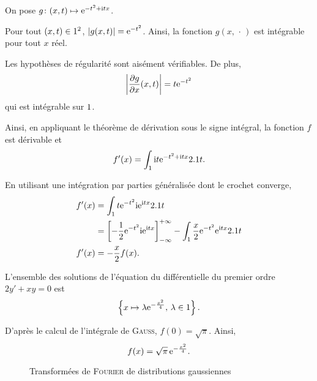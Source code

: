\begin{solution} On pose $\fonctionligne[g]{(x, t)}{\e^{-t^2 + \i t x}}$.
\begin{reponses}
\item Pour tout $(x, t) \in \R^2$,  $\module{g(x, t)} = \e^{-t^2}$. Ainsi, la fonction $g(x, \,\cdot\,)$ est intégrable pour tout $x$ réel.

\item Les hypothèses de régularité sont aisément vérifiables. De plus,
\[
\module{\frac{\partial g}{\partial x}(x, t)} = t \e^{-t^2}
\]
qui est intégrable sur $\R$.

Ainsi, en appliquant le théorème de dérivation sous le signe intégral, la fonction $f$ est dérivable et
\[
f'(x) = \int_\R \i t \e^{-t^2 + \i t x} \d t.
\]

\item En utilisant une intégration par parties généralisée dont le crochet converge,
\begin{align*}
f'(x) &= \int_\R t \e^{-t^2} \i \e^{\i t x} \d t \\
&= \left[-\frac{1}{2} \e^{-t^2} \i \e^{\i t x}\right]_{-\infty}^{+\infty} - \int_\R \frac{x}{2} \e^{-t^2} \e^{\i t x} \d t \\
f'(x) &= -\frac{x}{2} f(x).
\end{align*}

\item L'ensemble des solutions de l'équation du différentielle du premier ordre $2 y' + x y = 0$ est
\[
\left\{x \mapsto \lambda \e^{-\frac{x^2}{4}},\, \lambda \in \R\right\}.
\]

D'après le calcul de l'intégrale de \textsc{Gauss}, $f(0) = \sqrt{\pi}$. Ainsi,
\[
f(x) = \sqrt{\pi}\, \e^{-\frac{x^2}{4}}.
\]
\end{reponses}
\end{solution}

\begin{figure}
    \centering
    
    \caption{Transformées de \textsc{Fourier} de distributions gaussiennes }
\end{figure}



